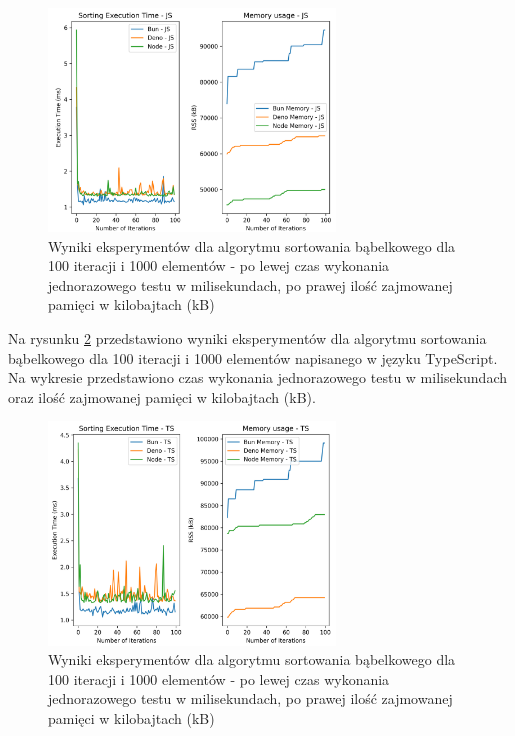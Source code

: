 \begin{figure}[H]
  \centering
  \includegraphics[width=0.68\textwidth]{Figures/sorting/sorting_bubble_100_1000_js.png}
  \caption{Wyniki eksperymentów dla algorytmu sortowania bąbelkowego dla 100 iteracji i 1000 elementów - po lewej czas wykonania jednorazowego testu w milisekundach, po prawej ilość zajmowanej pamięci w kilobajtach (kB)}
  \label{fig:bubble_sorting_e1}
\end{figure}

Na rysunku \ref{fig:bubble_sorting_e1_ts} przedstawiono wyniki eksperymentów dla algorytmu sortowania bąbelkowego dla 100 iteracji i 1000 elementów napisanego w języku TypeScript. Na wykresie przedstawiono czas wykonania jednorazowego testu w milisekundach oraz ilość zajmowanej pamięci w kilobajtach (kB).

\begin{figure}[H]
  \centering
  \includegraphics[width=0.68\textwidth]{Figures/sorting/sorting_bubble_100_1000_ts.png}
  \caption{Wyniki eksperymentów dla algorytmu sortowania bąbelkowego dla 100 iteracji i 1000 elementów - po lewej czas wykonania jednorazowego testu w milisekundach, po prawej ilość zajmowanej pamięci w kilobajtach (kB)}
  \label{fig:bubble_sorting_e1_ts}
\end{figure}

